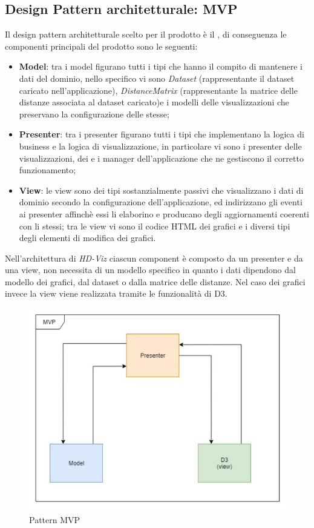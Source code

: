 \documentclass[../manuale_sviluppatore.tex]{subfiles}
\begin{document}
\subsection{Design Pattern architetturale: MVP}
Il design pattern architetturale scelto per il prodotto è il , di 
conseguenza le componenti principali del prodotto sono le seguenti:
\begin{itemize}
	\item \textbf{Model}: tra i model figurano tutti i tipi che hanno il compito di mantenere i dati 
	del dominio, nello specifico vi sono \emph{Dataset} (rappresentante il dataset caricato 
	nell'applicazione), \emph{DistanceMatrix} (rappresentante la matrice delle distanze associata 
	al dataset caricato)e i modelli delle visualizzazioni che preservano la configurazione delle 
	stesse;
	\item \textbf{Presenter}: tra i presenter figurano tutti i tipi che implementano la logica di 
	business e la logica di visualizzazione, in particolare vi sono i presenter delle 
	visualizzazioni, dei  e i manager dell'applicazione che ne gestiscono il 
	corretto funzionamento;
	\item \textbf{View}: le view sono dei tipi sostanzialmente passivi che visualizzano i dati di 
	dominio secondo la configurazione dell'applicazione, ed indirizzano gli eventi ai presenter 
	affinchè essi li elaborino e producano degli aggiornamenti coerenti con li stessi; tra le view 
	vi sono il codice HTML dei grafici e i diversi tipi degli elementi di modifica dei grafici.
\end{itemize}

Nell'architettura di \emph{HD-Viz} ciascun component è composto da un presenter e da una view, 
non necessita di un modello specifico in quanto i dati dipendono dal modello dei grafici, dal 
dataset o dalla matrice delle distanze. Nel caso dei grafici invece la view viene realizzata 
tramite le funzionalità di D3.

\begin{figure}[H]
	\centering
	\includegraphics[width=18cm]{img/patternMVP.jpg}
	\caption{Pattern MVP}
\end{figure}
\end{document}
